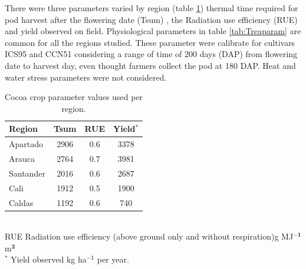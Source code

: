 \documentclass[gene,journal,article,submit,moreauthors,pdftex]{Definitions/mdpi}
\begin{document}
There were three parameters varied by region (table \ref{tab:reparam}) thermal time required for pod harvest after the flowering date (Tsum) , the Radiation use efficiency (RUE) and yield observed on field. Physiological parameters in table \ref{tab:Treaparam} are  common  for all the regions studied. These parameter were calibrate for cultivars ICS95 and CCN51 considering a range of time of 200 days (DAP) from flowering date to harvest day, even thought farmers collect the pod at 180 DAP. Heat and water stress parameters were not considered.


\begin{table}[h!]	
	\caption {\footnotesize {Cocoa crop parameter values used per region.}}
	\label{tab:reparam} 
	\centering
	\begin{small}
		\begin{tabular}{l c c c }
			\hline
			{\bf Region }&{\bf Tsum }&{\bf RUE}&{\bf Yield$^{*}$}\\
			\hline
			Apartado   & 2906 & 0.6 & 3378  \\
			Arauca   & 2764 & 0.7 & 3981  \\
			Santander & 2016 &0.6 & 2687 \\
			Cali   & 1912 & 0.5 & 1900  \\
			Caldas   & 1192 & 0.6 & 740  \\
			\hline
		\end{tabular} \\
		{\footnotesize RUE Radiation use efficiency (above ground only and without respiration)g MJ$^{\mathbf{-1}}$ m$^{\mathbf{2}}$\\$^{*}$ Yield observed kg ha$^{\mathsf{-1}}$ per year. } 
	\end{small}
\end{table}
\end{document}

